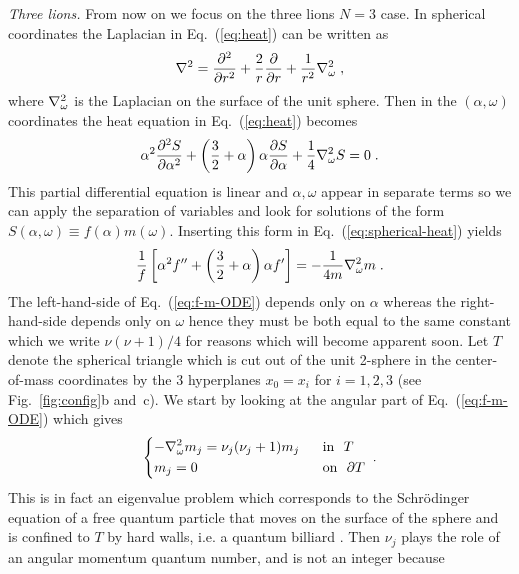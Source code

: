 \documentclass[aps,prl,twocolumn,superscriptaddress,floatfix,nofootinbib]{revtex4-2}
\begin{document}
\emph{Three lions. } From now on we focus on the three lions $N = 3$ case. In spherical coordinates the Laplacian in Eq.~(\ref{eq:heat}) can be written as
\begin{equation} \label{eq:spherical-laplacian}
    \laplacian = \pdv[2]{}{r} + \frac{2}{r} \pdv{}{r} + \frac{1}{r^2} \laplacian_\omega \;,
\end{equation}
where $\laplacian_\omega$ is the Laplacian on the surface of the unit sphere. Then in the $(\alpha, \omega)$ coordinates the heat equation in Eq.~(\ref{eq:heat}) becomes \cite{SM}
\begin{equation} \label{eq:spherical-heat}
    \alpha^2 \pdv[2]{S}{\alpha} + \left(\frac{3}{2} + \alpha\right)\alpha \pdv{S}{\alpha} + \frac{1}{4} \laplacian_\omega S = 0 \;.
\end{equation}
This partial differential equation is linear and $\alpha, \omega$ appear in separate terms so we can apply the separation of variables and look for solutions of the form $S(\alpha, \omega) \equiv f(\alpha) m(\omega)$. Inserting this form in Eq.~(\ref{eq:spherical-heat}) yields
\begin{equation} \label{eq:f-m-ODE}
    \frac{1}{f} \left[ \alpha^2 f'' + \left( \frac{3}{2} + \alpha \right) \alpha f' \right] = - \frac{1}{4 m}\laplacian_\omega m \;.
\end{equation} 
The left-hand-side of Eq.~(\ref{eq:f-m-ODE}) depends only on $\alpha$ whereas the right-hand-side depends only on $\omega$ hence they must be both equal to the same constant which we write $\nu(\nu+1)/4$ for reasons which will become apparent soon. Let $T$ denote the spherical triangle which is cut out of the unit 2-sphere in the center-of-mass coordinates by the 3 hyperplanes $x_0 = x_i$ for $i = 1, 2, 3$ (see Fig.~\ref{fig:config}b and~c). We start by looking at the angular part of Eq.~(\ref{eq:f-m-ODE}) which gives
\begin{equation} \label{eq:m-ODE}
    \begin{dcases}
        -\laplacian_\omega m_j = \nu_j(\nu_j + 1) m_j &\mbox{~~in~~} T \\
        m_j = 0 &\mbox{~~on~~} \partial T 
    \end{dcases} \;.
\end{equation}
This is in fact an eigenvalue problem which corresponds to the Schr\"odinger equation of a free quantum particle that moves on the surface of
the sphere and is confined to $T$ by hard walls, i.e.
a quantum billiard \cite{SS01}. Then $\nu_j$ plays the role of an angular momentum quantum number, and is not an integer because
\end{document}
